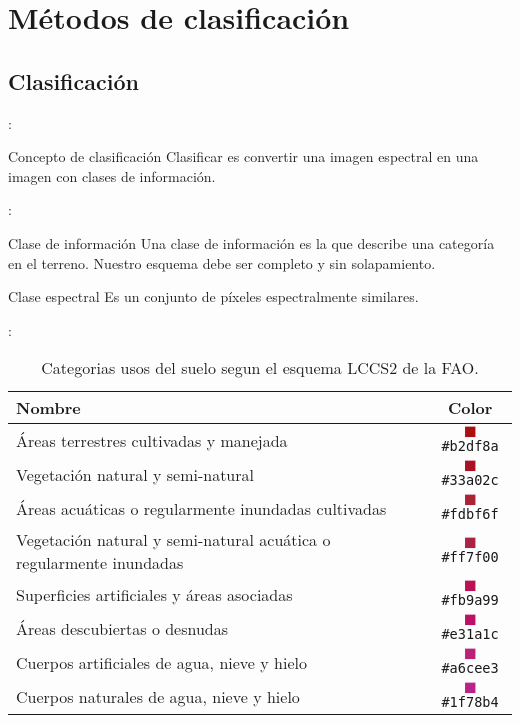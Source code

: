 \section{Métodos de clasificación}

\subsection{Clasificación}
\begin{frame}{\secname : \subsecname}
\begin{block}{Concepto de clasificación}
  Clasificar es convertir una imagen espectral en una imagen con clases de información.
\end{block}
\end{frame}

\begin{frame}{\secname : \subsecname}
\begin{block}{Clase de información}
  Una clase de información es la que describe una categoría en el terreno. \pause Nuestro esquema debe ser completo y sin solapamiento.
\end{block}
\pause
\begin{block}{Clase espectral}
  Es un conjunto de píxeles espectralmente similares.
\end{block}
\end{frame}

\begin{frame}{\secname : \subsecname}
  \begin{table}[hbt]
      \centering
      \begin{tabular}{p{12cm}c}
          \toprule
          Nombre & Color \\
          \midrule
          Áreas terrestres cultivadas y manejada & \textcolor{A11}{$\blacksquare$}\texttt{\#b2df8a}
          \\
          Vegetación natural y semi-natural  & \textcolor{A12}{$\blacksquare$}\texttt{\#33a02c}\\
          Áreas acuáticas o regularmente inundadas cultivadas &
          \textcolor{A23}{$\blacksquare$}\texttt{\#fdbf6f}\\
          Vegetación natural y semi-natural acuática o
  	regularmente inundadas  & \textcolor{A24}{$\blacksquare$}\texttt{\#ff7f00}\\
          Superficies artificiales y áreas asociadas  &
          \textcolor{B15}{$\blacksquare$}\texttt{\#fb9a99}\\
          Áreas descubiertas o desnudas  & \textcolor{B16}{$\blacksquare$}\texttt{\#e31a1c}\\
          Cuerpos artificiales de agua, nieve y hielo  &
          \textcolor{B27}{$\blacksquare$}\texttt{\#a6cee3}\\
          Cuerpos naturales de agua, nieve y hielo &
          \textcolor{B28}{$\blacksquare$}\texttt{\#1f78b4}\\
          \bottomrule
      \end{tabular}
  \caption{\label{tab:usos}Categorias usos del suelo segun el esquema LCCS2 de la FAO.}
  \end{table}
\end{frame}

